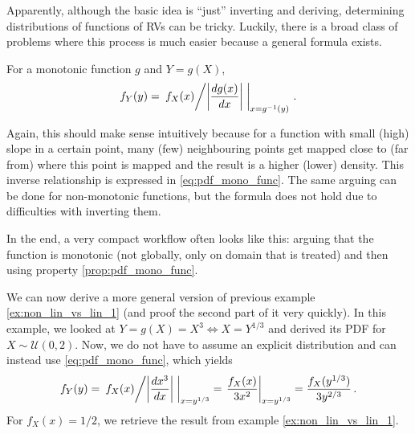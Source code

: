 Apparently, although the basic idea is \enquote{just} inverting and deriving, determining distributions of functions of RVs can be tricky. Luckily, there is a broad class of problems where this process is much easier because a general formula exists.
\begin{prop}\label{prop:pdf_mono_func}
For a monotonic function $g$ and $Y = g(X)$,
\begin{equation}\label{eq:pdf_mono_func}
f_Y(y) = \eval{\flatfrac{f_X(x)}{\abs{\dv{g(x)}{x}}}}_{x = g^{-1}(y)} \, .
\end{equation}
\end{prop}
Again, this should make sense intuitively because for a function with small (high) slope in a certain point, many (few) neighbouring points get mapped close to (far from) where this point is mapped and the result is a higher (lower) density. This inverse relationship is expressed in \eqref{eq:pdf_mono_func}. The same arguing can be done for non-monotonic functions, but the formula does not hold due to difficulties with inverting them.

In the end, a very compact workflow often looks like this: arguing that the function is monotonic (not globally, only on domain that is treated) and then using property \ref{prop:pdf_mono_func}.



\begin{ex}
We can now derive a more general version of previous example \ref{ex:non_lin_vs_lin_1} (and proof the second part of it very quickly). In this example, we looked at $Y = g(X) = X^3 \Leftrightarrow X = Y^{1 / 3}$ and derived its PDF for $X \sim \mathcal{U}(0, 2)$. Now, we do not have to assume an explicit distribution and can instead use \eqref{eq:pdf_mono_func}, which yields
\begin{equation*}
f_Y(y) = \eval{\flatfrac{f_X(x)}{\abs{\dv{x^3}{x}}}}_{x = y^{1 / 3}} = \eval{\frac{f_X(x)}{3 x^2}}_{x = y^{1 / 3}} = \frac{f_X(y^{1 / 3})}{3 y^{2 / 3}} \, .
\end{equation*}
For $f_X(x) = 1 / 2$, we retrieve the result from example \ref{ex:non_lin_vs_lin_1}.
\end{ex}



